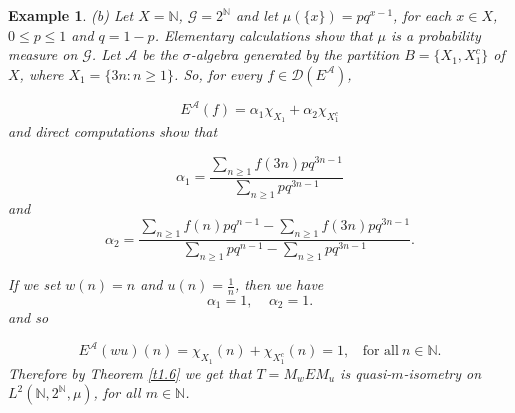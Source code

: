 \documentclass{amsart}
\newtheorem{exam}[thm]{Example}
\theoremstyle{definition}\newtheorem{defn}[thm]{Definition}
\theoremstyle{remark}
\numberwithin{equation}{section}
\begin{document}
\begin{exam}
(b)  Let $X=\mathbb{N}$,
$\mathcal{G}=2^{\mathbb{N}}$ and let $\mu(\{x\})=pq^{x-1}$, for
each $x\in X$, $0\leq p\leq 1$ and $q=1-p$. Elementary
calculations show that $\mu$ is a probability measure on
$\mathcal{G}$. Let $\mathcal{A}$ be the $\sigma$-algebra generated
by the partition $B=\{X_1, X^{c}_1\}$ of $X$, where $X_1=\{3n:n\geq1\}$. So,
for every $f\in \mathcal{D}(E^{\mathcal{A}})$,

$$E^{\mathcal{A}}(f)=\alpha_1\chi_{X_1}+\alpha_2\chi_{X^c_1}$$
and direct computations show that

$$\alpha_1=\frac{\sum_{n\geq1}f(3n)pq^{3n-1}}{\sum_{n\geq1}pq^{3n-1}}$$
and
$$\alpha_2=\frac{\sum_{n\geq1}f(n)pq^{n-1}-\sum_{n\geq1}f(3n)pq^{3n-1}}{\sum_{n\geq1}pq^{n-1}-\sum_{n\geq1}pq^{3n-1}}.$$

If we set $w(n)=n$ and $u(n)=\frac{1}{n}$, then we have 
$$\alpha_1=1, \ \ \ \ \ \alpha_2=1.$$
and so 

$$E^{\mathcal{A}}(wu)(n)=\chi_{X_1}(n)+\chi_{X^c_1}(n)=1,\ \ \ \ \text{for all} \ n\in \mathbb{N}.$$
Therefore by Theorem \ref{t1.6} we get that $T=M_wEM_u$ is quasi-$m$-isometry on $L^2(\mathbb{N},2^{\mathbb{N}},\mu)$,  for all $m\in \mathbb{N}$.


\end{exam}
\end{document}
